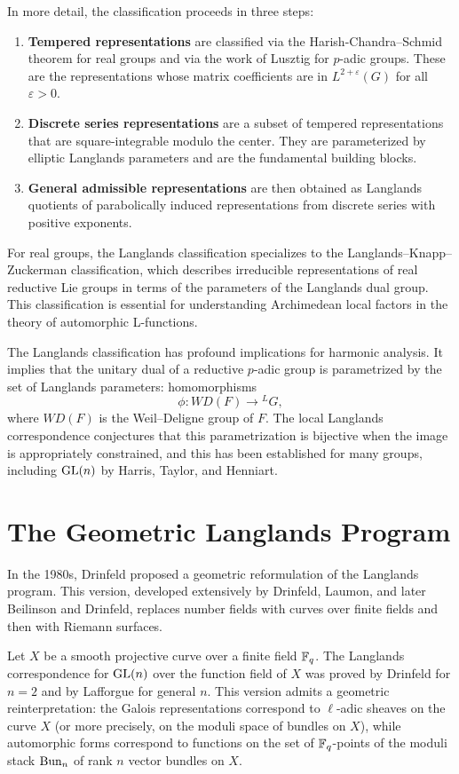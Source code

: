 In more detail, the classification proceeds in three steps:
\begin{enumerate}
\item \textbf{Tempered representations} are classified via the Harish-Chandra--Schmid theorem for real groups and via the work of Lusztig for \(p\)-adic groups. These are the representations whose matrix coefficients are in \(L^{2+\varepsilon}(G)\) for all \(\varepsilon > 0\).
\item \textbf{Discrete series representations} are a subset of tempered representations that are square-integrable modulo the center. They are parameterized by elliptic Langlands parameters and are the fundamental building blocks.
\item \textbf{General admissible representations} are then obtained as Langlands quotients of parabolically induced representations from discrete series with positive exponents.
\end{enumerate}

For real groups, the Langlands classification specializes to the Langlands--Knapp--Zuckerman classification, which describes irreducible representations of real reductive Lie groups in terms of the parameters of the Langlands dual group. This classification is essential for understanding Archimedean local factors in the theory of automorphic L-functions.

The Langlands classification has profound implications for harmonic analysis. It implies that the unitary dual of a reductive \(p\)-adic group is parametrized by the set of Langlands parameters: homomorphisms
\[
\phi : WD(F) \to {}^L G,
\]
where \(WD(F)\) is the Weil--Deligne group of \(F\). The local Langlands correspondence conjectures that this parametrization is bijective when the image is appropriately constrained, and this has been established for many groups, including \(\operatorname{GL}(n)\) by Harris, Taylor, and Henniart.

\section{The Geometric Langlands Program}

In the 1980s, Drinfeld proposed a geometric reformulation of the Langlands program. This version, developed extensively by Drinfeld, Laumon, and later Beilinson and Drinfeld, replaces number fields with curves over finite fields and then with Riemann surfaces.

Let \(X\) be a smooth projective curve over a finite field \(\mathbb{F}_q\). The Langlands correspondence for \(\operatorname{GL}(n)\) over the function field of \(X\) was proved by Drinfeld for \(n=2\) and by Lafforgue for general \(n\). This version admits a geometric reinterpretation: the Galois representations correspond to \(\ell\)-adic sheaves on the curve \(X\) (or more precisely, on the moduli space of bundles on \(X\)), while automorphic forms correspond to functions on the set of \(\mathbb{F}_q\)-points of the moduli stack \(\operatorname{Bun}_n\) of rank \(n\) vector bundles on \(X\).

